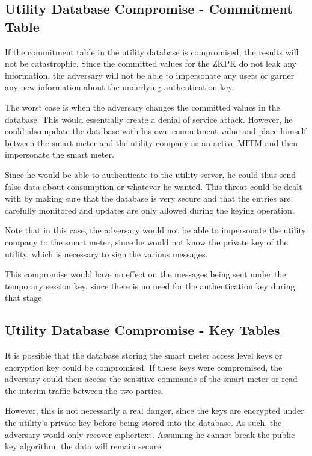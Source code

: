 \subsection{Utility Database Compromise - Commitment Table}
If the commitment table in the utility database is compromised, the results will not be catastrophic. Since the committed
values for the ZKPK do not leak any information, the adversary will not be able to impersonate any users or garner
any new information about the underlying authentication key.

The worst case is when the adversary changes the committed values in the database. This would essentially create a
denial of service attack. However, he could also update the database with his own commitment value and place
himself between the smart meter and the utility company as an active MITM and then impersonate the smart
meter. 

Since he would be able to authenticate to the utility server, he could thus send false data about consumption or 
whatever he wanted. This threat could be dealt with by making sure that the database is very secure
and that the entries are  carefully monitored and updates are only allowed during the keying operation.

Note that in this case, the adversary would not be able to impersonate the utility company to the smart meter,
since he would not know the private key of the utility, which is necessary to sign the various messages.

This compromise would have no effect on the messages being sent under the temporary session key, since
there is no need for the authentication key during that stage.

\subsection{Utility Database Compromise - Key Tables }
It is possible that the database storing the smart meter access level keys or encryption key could be compromised. 
If these keys were compromised, the adversary could then access the sensitive commands
of the smart meter or read the interim traffic between the two parties.

However, this is not necessarily a real danger, since the keys are encrypted under the utility's private key before being
stored into the database. As such, the adversary would only recover ciphertext. Assuming he cannot break the public
key algorithm, the data will remain secure.

